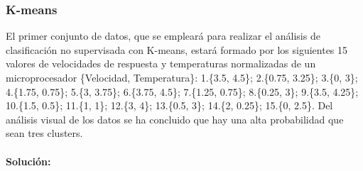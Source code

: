 \documentclass[a4paper, 12pt]{article}
\begin{document}
	\subsubsection{K-means}
	
	El primer conjunto de datos, que se empleará para realizar el análisis de clasificación no supervisada con K-means, estará formado por los siguientes 15 valores de velocidades de respuesta y temperaturas normalizadas de un microprocesador \{Velocidad, Temperatura\}: 1.\{3.5, 4.5\}; 2.\{0.75, 3.25\}; 3.\{0, 3\}; 4.\{1.75, 0.75\}; 5.\{3, 3.75\}; 6.\{3.75, 4.5\}; 7.\{1.25, 0.75\}; 8.\{0.25, 3\}; 9.\{3.5, 4.25\}; 10.\{1.5, 0.5\}; 11.\{1, 1\}; 12.\{3, 4\}; 13.\{0.5, 3\}; 14.\{2, 0.25\}; 15.\{0, 2.5\}. Del análisis visual de los datos se ha concluido que hay una alta probabilidad que sean tres clusters.
	
	\paragraph{Solución:}
\end{document}
